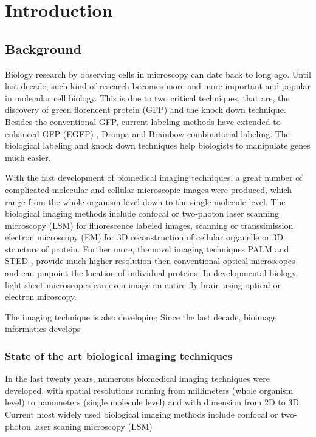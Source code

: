 \chapter{Introduction}
\section{Background}
Biology research by observing cells in microscopy can date back to long ago. Until last decade, such kind of research becomes more and more important and popular in molecular cell biology. This is due to two critical techniques, that are, the discovery of green florencent protein (GFP) \cite{} and the knock down technique\cite{}. Besides the conventional GFP, current labeling methods have extended to enhanced GFP (EGFP) \cite{}, Dronpa \cite{} and Brainbow combinatorial labeling. The biological labeling and knock down techniques help biologists to manipulate genes much easier.

With the fast development of biomedical imaging techniques, a great number of complicated molecular and cellular microscopic images were produced, which range from the whole organism level down to the single molecule level. The biological imaging methods include confocal or two-photon laser scanning microscopy (LSM) \cite{} for fluorescence labeled images, scanning or transsimission electron microscopy (EM) \cite{} for 3D reconstruction of cellular organelle or 3D structure of protein. Further more, the novel imaging techniques PALM \cite{} and STED \cite{}, provide much higher resolution then conventional optical microscopes and can pinpoint the location of individual proteins. In developmental biology, light sheet\cite{} microscopes can even image an entire fly brain using optical or electron micoscopy.

The imaging technique is also developing 
Since the last decade, bioimage informatics develops
\subsection{State of the art biological imaging techniques}
In the last twenty years, numerous biomedical imaging techniques were developed, with spatial resolutions running from millimeters (whole organism level) to nanometers (single molecule level) \cite{murphy2012fundamentals,Tsien2003} and with dimension from 2D to 3D. 
Current most widely used biological imaging methods include confocal or two-photon laser scaning microscopy (LSM) 

